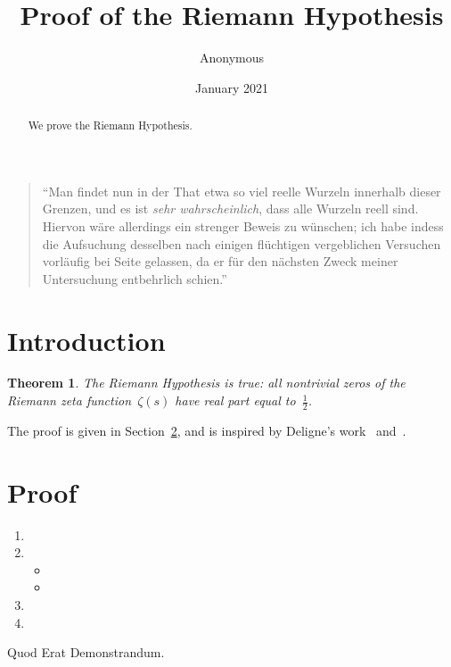 \documentclass{amsart}
\title{Proof of the Riemann Hypothesis}
\author{Anonymous}
\date{January 2021}
\newtheorem{theorem}{Theorem}
\newcommand{\myemph}[1]{\textsl{#1}}
\begin{document}
\begin{abstract}
We prove the Riemann Hypothesis.
\end{abstract}

\maketitle
\tableofcontents

\begin{quote}
``Man findet nun in der That etwa so viel reelle Wurzeln innerhalb dieser Grenzen, und es ist \myemph{sehr wahrscheinlich}, dass alle Wurzeln reell sind.
Hiervon wäre allerdings ein strenger Beweis zu wünschen; ich habe indess die Aufsuchung desselben nach einigen flüchtigen vergeblichen Versuchen vorläufig bei Seite gelassen, da er für den nächsten Zweck meiner Untersuchung entbehrlich schien.'' \cite{Riemann}
\end{quote}

\section{Introduction}
\label{intro}

\begin{theorem}
\label{mainresult}
The Riemann Hypothesis is true: all nontrivial zeros of the Riemann zeta function~\(
\zeta(s)
\) have real part equal to~\(\frac{1}{2}\).
\end{theorem}

The proof is given in Section~\ref{proof}, and is inspired by Deligne's work~\cite{MR340258} and~\cite{MR601520}.

\section{Proof}
\label{proof}

\begin{enumerate}
\item
\item
    \begin{itemize}
    \item
    \item
    \end{itemize}
\item
\item
\end{enumerate}
Quod Erat Demonstrandum. \qedsymbol



\end{document}
